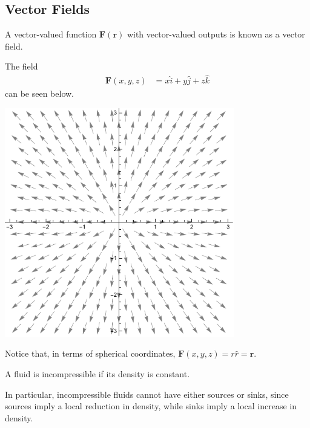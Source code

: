 \documentclass[10pt]{mypackage}
\begin{document}
\subsection{Vector Fields}%
\begin{definition}
  A vector-valued function $\mathbf{F}\left(\mathbf{r}\right)$ with vector-valued outputs is known as a vector field.
\end{definition}
\begin{example}
  The field
  \begin{align*}
  \mathbf{F}\left(x,y,z\right) &= x\widehat{i} + y\widehat{j} + z\widehat{k}
  \end{align*}
  can be seen below.
  \begin{center}
    \includegraphics[width=10cm]{images/xyz_vector_field.pdf}
  \end{center}
  Notice that, in terms of spherical coordinates, $\mathbf{F}\left(x,y,z\right) = r\widehat{r} = \mathbf{r}$.
\end{example}
\begin{definition}
  A fluid is incompressible if its density is constant.\newline

  In particular, incompressible fluids cannot have either sources or sinks, since sources imply a local reduction in density, while sinks imply a local increase in density.
\end{definition}
\end{document}
